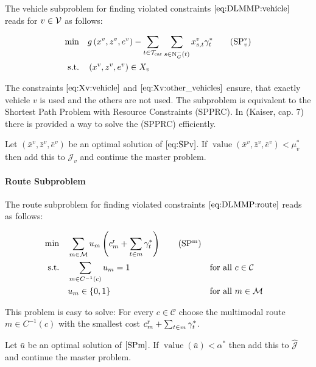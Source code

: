 The vehicle subproblem for finding violated constraints $\eqref{eq:DLMMP:vehicle}$ reads for $v\in\mathcal{V}$ as follows:

\begin{align*}
	\min \quad & g\left(x^v,z^v,e^v\right)-\sum_{t\in\Tcar}\sum_{s\in\Nin(t)}x^v_{s,t}\gamma^*_t \tag{$\SPv_v$} \label{eq:SPv} \\
	\text{s.t.} \quad & \left(x^v,z^v,e^v\right)\in X_v
\end{align*}

The constraints $\eqref{eq:Xv:vehicle}$ and $\eqref{eq:Xv:other_vehicles}$ ensure, that exactly vehicle $v$ is used and the others are not used. The subproblem is equivalent to the Shortest Path Problem with Resource Constraints (SPPRC). In (Kaiser, cap. 7) there is provided a way to solve the (SPPRC) efficiently.

Let $\left(\bar{x}^v,\bar{z}^v,\bar{e}^v\right)$ be an optimal solution of $\eqref{eq:SPv}$. If $\operatorname{value}\left(\bar{x}^v,\bar{z}^v,\bar{e}^v\right)<\mu_v^*$ then add this to $\mathcal{J}_v$ and continue the master problem.

\paragraph{Route Subproblem} \parfill

The route subproblem for finding violated constraints $\eqref{eq:DLMMP:route}$ reads as follows:

\begin{align*}
	\min \quad & \sum_{m\in\mathcal{M}}u_m\left(\croute_m + \sum_{t\in m}\gamma^*_t\right) \tag{$\SPm$} \label{SPm} \\
	\text{s.t.} \quad & \sum_{m\in C^{-1}(c)}u_m = 1 && \text{for all } c\in\mathcal{C} \\
	& u_m\in\{0,1\} && \text{for all } m\in\mathcal{M}
\end{align*}

This problem is easy to solve: For every $c\in\mathcal{C}$ choose the multimodal route $m\in C^{-1}(c)$ with the smallest cost $c^{\operatorname{r}}_m + \sum_{t\in m}\gamma^*_t$. 

Let $\bar{u}$ be an optimal solution of $\eqref{SPm}$. If $\operatorname{value}\left(\bar{u}\right)<\alpha^*$ then add this to $\hat{\mathcal{J}}$ and continue the master problem.